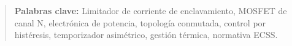 \documentclass[12pt]{report} %
\begin{document}
\begin{abstract}
\noindent\textbf{Palabras clave:} Limitador de corriente de enclavamiento, MOSFET de canal N, electrónica de potencia, topología conmutada, control por histéresis, temporizador asimétrico, gestión térmica, normativa ECSS.

\vfill

	
	
\end{abstract}
\clearpage
\end{document}
